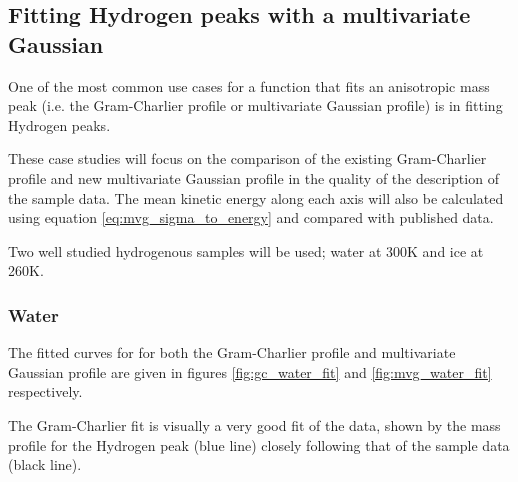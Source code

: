 \documentclass[a4paper]{article}
\begin{document}
\subsection{Fitting Hydrogen peaks with a multivariate Gaussian}
\label{sec:mvg_case_studies}

One of the most common use cases for a function that fits an anisotropic mass
peak (i.e. the Gram-Charlier profile or multivariate Gaussian profile) is in
fitting Hydrogen peaks.

These case studies will focus on the comparison of the existing Gram-Charlier
profile and new multivariate Gaussian profile in the quality of the description
of the sample data. The mean kinetic energy along each axis will also be
calculated using equation \ref{eq:mvg_sigma_to_energy} and compared with
published data.

Two well studied hydrogenous samples will be used; water at 300K and ice at
260K.

\subsubsection{Water}

The fitted curves for for both the Gram-Charlier profile and multivariate
Gaussian profile are given in figures \ref{fig:gc_water_fit} and
\ref{fig:mvg_water_fit} respectively.

The Gram-Charlier fit is visually a very good fit of the data, shown by the mass
profile for the Hydrogen peak (blue line) closely following that of the sample
data (black line).
\end{document}
